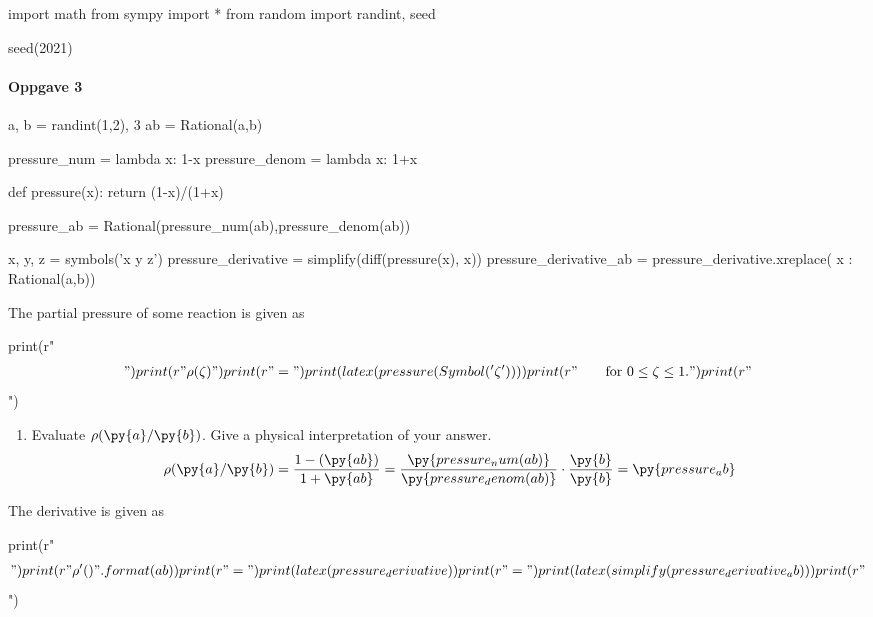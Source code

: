 \documentclass{article}
\begin{document}
\begin{pycode}
import math
from sympy import *
from random import randint, seed

seed(2021)
\end{pycode}

\paragraph{Oppgave 3}

\begin{pycode}
a, b = randint(1,2), 3
ab = Rational(a,b)

pressure_num = lambda x: 1-x
pressure_denom = lambda x: 1+x

def pressure(x):
  return (1-x)/(1+x)

pressure_ab = Rational(pressure_num(ab),pressure_denom(ab))

x, y, z = symbols('x y z')
pressure_derivative = simplify(diff(pressure(x), x))
pressure_derivative_ab = pressure_derivative.xreplace({ x : Rational(a,b)}) 
\end{pycode}

The partial pressure of some reaction is given as
%
\begin{pycode}
print(r"\begin{align*}")
print(r"\rho(\zeta)")
print(r"=")
print(latex(pressure(Symbol('\zeta'))))
print(r"\qquad \text{for} \ 0 \leq \zeta \leq 1.")
print(r"\end{align*}")
\end{pycode}
%
\begin{enumerate}[label=\alph*)]
    \item Evaluate $\rho(\py{a}/\py{b})$. Give a physical interpretation of your
        answer.
    \begin{equation*}
        \rho(\py{a}/\py{b})
        = \frac{1-(\py{ab})}{1+\py{ab}}
        = \frac{\py{pressure_num(ab)}}{\py{pressure_denom(ab)}}
        \cdot \frac{\py{b}}{\py{b}}
        = \py{pressure_ab}
    \end{equation*}
\end{enumerate}

The derivative is given as
%
\begin{pycode}
print(r"\begin{align*}")
print(r"\rho'({})".format(ab))
print(r"=")
print(latex(pressure_derivative))
print(r"=")
print(latex(simplify(pressure_derivative_ab)))
print(r"\end{align*}")
\end{pycode}
\end{document}
